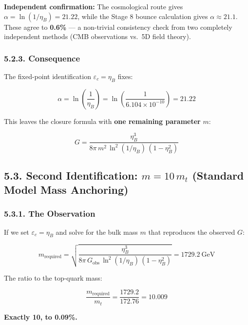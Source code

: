 \documentclass[
  11pt,
]{article}
\begin{document}
\textbf{Independent confirmation:} The cosmological route gives
\(\alpha = \ln(1/\eta_B) = 21.22\), while the Stage 8 bounce calculation
gives \(\alpha \approx 21.1\). These agree to \textbf{0.6\%} --- a
non-trivial consistency check from two completely independent methods
(CMB observations vs.~5D field theory).

\hypertarget{consequence}{%
\subsubsection{5.2.3. Consequence}\label{consequence}}

The fixed-point identification \(\varepsilon_c = \eta_B\) fixes:

\[\alpha = \ln\!\left(\frac{1}{\eta_B}\right) = \ln\!\left(\frac{1}{6.104 \times 10^{-10}}\right) = 21.22 \tag{217}\]

This leaves the closure formula with \textbf{one remaining parameter}
\(m\):

\[G = \frac{\eta_B^3}{8\pi\,m^2\,\ln^2(1/\eta_B)\,(1 - \eta_B^2)} \tag{218}\]

\bigskip

\hypertarget{second-identification-m-10m_t-standard-model-mass-anchoring}{%
\subsection{\texorpdfstring{5.3. Second Identification: \(m = 10\,m_t\)
(Standard Model Mass
Anchoring)}{5.3. Second Identification: m = 10\textbackslash,m\_t (Standard Model Mass Anchoring)}}\label{second-identification-m-10m_t-standard-model-mass-anchoring}}

\hypertarget{the-observation-1}{%
\subsubsection{5.3.1. The Observation}\label{the-observation-1}}

If we set \(\varepsilon_c = \eta_B\) and solve for the bulk mass \(m\)
that reproduces the observed \(G\):

\[m_{\text{required}} = \sqrt{\frac{\eta_B^3}{8\pi\,G_{\text{obs}}\,\ln^2(1/\eta_B)\,(1-\eta_B^2)}} = 1729.2~\text{GeV} \tag{219}\]

The ratio to the top-quark mass:

\[\frac{m_{\text{required}}}{m_t} = \frac{1729.2}{172.76} = \mathbf{10.009} \tag{220}\]

\textbf{Exactly 10, to 0.09\%.}
\end{document}
